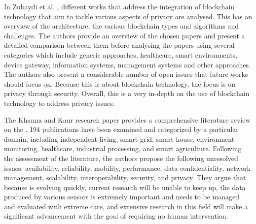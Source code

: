 In Zubaydi et al. \cite{zubaydi2023leveraging}, different works that address the
integration of blockchain technology that aim to tackle various aspects of privacy
are analysed. This \hyperlink{\acronym}{\acronym} has an overview of the \hyperlink{\acronym}{\acronym} architecture, the various blockchain
types and algorithms and \hyperlink{\acronym}{\acronym} challenges. The authors provide an overview of the
chosen papers and present a detailed comparison between them before analysing
the papers using several categories which include generic approaches, healthcare,
smart environments, \hyperlink{\acronym}{\acronym} device gateway, \hyperlink{\acronym}{\acronym} information systems, management systems
and other approaches. The authors also present a considerable number of open issues
that future works should focus on. Because this \hyperlink{\acronym}{\acronym} is about blockchain technology,
the focus is on privacy through security. Overall, this is a very in-depth \hyperlink{\acronym}{\acronym} on the
use of blockchain technology to address privacy issues.

The Khanna and Kaur \cite{khanna2020internet} research paper provides a comprehensive
literature review on the \hyperlink{\acronym}{\acronym}. 194 publications have been examined and categorized
by a particular domain, including independent living, smart grid, smart house,
environment monitoring, healthcare, industrial processing, and smart agriculture.
Following the assessment of the literature, the authors propose the following
unresolved issues: availability, reliability, mobility, performance, data
confidentiality, network management, scalability, interoperability, security,
and privacy. They argue that because \hyperlink{\acronym}{\acronym} is evolving quickly, current research
will be unable to keep up, the data produced by various sensors is extremely
important and needs to be managed and evaluated with extreme care, and extensive
research in this field will make a significant advancement with the goal of
requiring no human intervention.

